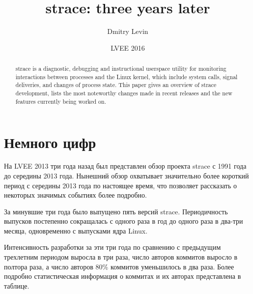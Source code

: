 \documentclass[russian,a4paper,12pt]{article}
\begin{document}
\author{Dmitry Levin}
\title{strace: three years later}
\date{LVEE 2016}

\maketitle

\begin{abstract}
strace is a diagnostic, debugging and instructional userspace utility for
monitoring interactions between processes and the Linux kernel, which include
system calls, signal deliveries, and changes of process state.
This paper gives an overview of strace development, lists the most
noteworthy changes made in recent releases and the new features currently
being worked on.
\end{abstract}

\section*{Немного цифр}
На LVEE 2013 три года назад был представлен обзор проекта strace с 1991 года
до середины 2013 года\cite{lvee2013}.  Нынешний обзор охватывает значительно более короткий
период с середины 2013 года по настоящее время, что позволяет рассказать о
некоторых значимых событиях более подробно.

За минувшие три года было выпущено пять версий strace.
Периодичность выпусков постепенно сокращалась с одного раза в год
до одного раза в два-три месяца, одновременно с выпусками ядра Linux.

Интенсивность разработки за эти три года по сравнению с предыдущим
трехлетним периодом выросла в три раза, число авторов коммитов выросло в
полтора раза, а число авторов 80\% коммитов уменьшилось в два раза.  Более
подробно статистическая информация о коммитах и их авторах представлена в
таблице.
\end{document}
